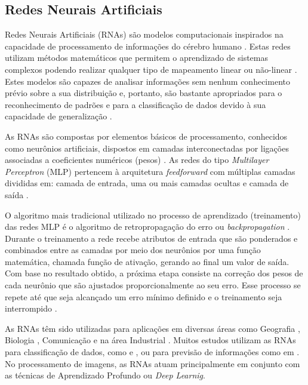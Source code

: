 \subsection{Redes Neurais Artificiais}
Redes Neurais Artificiais (RNAs) são modelos computacionais inspirados na capacidade de processamento de informações do cérebro humano \cite{ref1:guedes,ref2:rojas}. Estas redes utilizam  métodos matemáticos que permitem o aprendizado de sistemas complexos podendo realizar qualquer tipo de mapeamento linear ou não-linear \cite{ref6:castro,ref7:duarte}. Estes modelos são capazes de analisar informações sem nenhum conhecimento prévio sobre a sua distribuição e, portanto, são bastante apropriados para o reconhecimento de padrões e para a classificação de dados devido à sua capacidade de generalização \cite{ref4:prego,ref8:filho}.

As RNAs são compostas por elementos básicos de processamento, conhecidos como neurônios artificiais, dispostos em camadas interconectadas por ligações associadas a coeficientes numéricos (pesos) \cite{ref4:prego,ref9:nobrega}. As redes do tipo \textit{Multilayer Perceptron} (MLP) pertencem à arquitetura \textit{feedforward} com múltiplas camadas divididas em: camada de entrada, uma ou mais camadas ocultas e camada de saída \cite{ref10:faceli}. 

O algoritmo mais tradicional utilizado no processo de aprendizado (treinamento) das redes MLP é o algoritmo de retropropagação do erro ou \textit{backpropagation} \cite{ref11:teive}. Durante o treinamento a rede recebe atributos de entrada que são ponderados e combinados entre as camadas por meio dos neurônios por uma função matemática, chamada função de ativação, gerando ao final um valor de saída. Com base no resultado obtido, a próxima etapa consiste na correção dos pesos de cada neurônio que são ajustados proporcionalmente ao seu erro. Esse processo se repete até que seja alcançado um erro mínimo definido e o treinamento seja interrompido \cite{ref10:faceli,ref1:guedes,ref5:aguni}.

\newpage

As RNAs têm sido utilizadas para aplicações em diversas áreas como Geografia \cite{ref11:teive}, Biologia \cite{ref7:duarte}, Comunicação \cite{ref12:balieiro} e na área Industrial \cite{ref4:prego}. Muitos estudos utilizam as RNAs para classificação de dados, como \cite{ref1:guedes} e \cite{ref3:lima}, ou para previsão de informações como em \cite{ref7:duarte}. No processamento de imagens, as RNAs atuam principalmente em conjunto com as técnicas de Aprendizado Profundo ou \textit{Deep Learnig}. 


